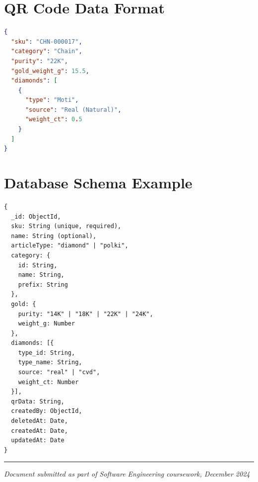 \documentclass[12pt,a4paper]{article}
\begin{document}
\appendix

\section{QR Code Data Format}

\begin{lstlisting}[language=json, caption={QR Code Data Structure}]
{
  "sku": "CHN-000017",
  "category": "Chain",
  "purity": "22K",
  "gold_weight_g": 15.5,
  "diamonds": [
    {
      "type": "Moti",
      "source": "Real (Natural)",
      "weight_ct": 0.5
    }
  ]
}
\end{lstlisting}

\section{Database Schema Example}

\begin{lstlisting}[caption={Item Schema (MongoDB)}]
{
  _id: ObjectId,
  sku: String (unique, required),
  name: String (optional),
  articleType: "diamond" | "polki",
  category: {
    id: String,
    name: String,
    prefix: String
  },
  gold: {
    purity: "14K" | "18K" | "22K" | "24K",
    weight_g: Number
  },
  diamonds: [{
    type_id: String,
    type_name: String,
    source: "real" | "cvd",
    weight_ct: Number
  }],
  qrData: String,
  createdBy: ObjectId,
  deletedAt: Date,
  createdAt: Date,
  updatedAt: Date
}
\end{lstlisting}

\vspace{1cm}
\begin{center}
\rule{0.5\textwidth}{0.5pt}

\textit{Document submitted as part of Software Engineering coursework, December 2024}
\end{center}
\end{document}
